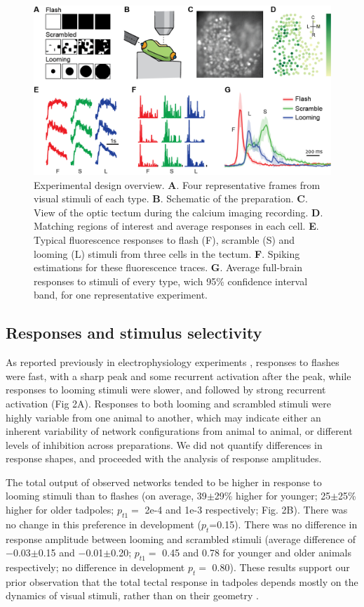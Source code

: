 \documentclass{article}
\begin{document}
\begin{figure}
\includegraphics[width=\linewidth]{fig1.png}
\caption{
Experimental design overview. \textbf{A}. Four representative frames from visual stimuli of each type. \textbf{B}. Schematic of the preparation. \textbf{C}. View of the optic tectum during the calcium imaging recording. \textbf{D}. Matching regions of interest and average responses in each cell. \textbf{E}. Typical fluorescence responses to flash (F), scramble (S) and looming (L) stimuli from three cells in the tectum. \textbf{F}. Spiking estimations for these fluorescence traces. \textbf{G}. Average full-brain responses to stimuli of every type, wich 95\% confidence interval band, for one representative experiment. }
\end{figure}

\subsection*{Responses and stimulus selectivity}

As reported previously in electrophysiology experiments \citep{khakhalin2014}, responses to flashes were fast, with a sharp peak and some recurrent activation after the peak, while responses to looming stimuli were slower, and followed by strong recurrent activation (Fig 2A). Responses to both looming and scrambled stimuli were highly variable from one animal to another, which may indicate either an inherent variability of network configurations from animal to animal, or different levels of inhibition across preparations. We did not quantify differences in response shapes, and proceeded with the analysis of response amplitudes.

The total output of observed networks tended to be higher in response to looming stimuli than to flashes (on average, 39$\pm$29\% higher for younger; 25$\pm$25\% higher for older tadpoles; $p_{t1}=$ 2e-4 and 1e-3 respectively; Fig. 2B). There was no change in this preference in development ($p_t$=0.15). There was no difference in response amplitude between looming and scrambled stimuli (average difference of $-$0.03$\pm$0.15 and $-$0.01$\pm$0.20; $p_{t1}=$ 0.45 and 0.78 for younger and older animals respectively; no difference in development $p_t=$ 0.80). These results support our prior observation that the total tectal response in tadpoles depends mostly on the dynamics of visual stimuli, rather than on their geometry \citep{khakhalin2014,jang2016}.
\end{document}
